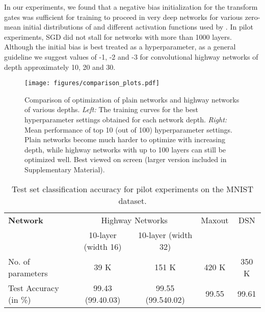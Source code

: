 \documentclass{article}
\begin{document}
In our experiments, we found that a negative bias initialization for the transform gates was sufficient for training to proceed in very deep networks for various zero-mean initial distributions of  and different activation functions used by . In pilot experiments, SGD did not stall for networks with more than 1000 layers. Although the initial bias is best treated as a hyperparameter, as a general guideline we suggest values of -1, -2 and -3 for convolutional highway networks of depth approximately 10, 20 and 30.

\begin{figure*}[t]
\texttt{[image: figures/comparison\_plots.pdf]}
\caption{Comparison of optimization of plain networks and highway networks of various depths. \textit{Left:} The training curves for the best hyperparameter settings obtained for each network depth. \textit{Right:} Mean performance of top 10 (out of 100) hyperparameter settings. Plain networks become much harder to optimize with increasing depth, while highway networks with up to 100 layers can still be optimized well. Best viewed on screen (larger version included in Supplementary Material).}
\label{fig:mnist-convergence}
\end{figure*}


\begin{table*}
	\centering
    \begin{tabular}{lcccc}
    \hline
    \textbf{Network}   & \multicolumn{2}{c}{Highway Networks} & Maxout \cite{Goodfellow2013} & DSN \cite{Lee2015} \\
              & 10-layer (width 16) & 10-layer (width 32) & & \\
    \hline
    No. of parameters & 39 K & 151 K & 420 K & 350 K\\
    Test Accuracy (in \%) & 99.43 (99.40.03) & 99.55 (99.540.02) & 99.55 & 99.61 \\
    \hline
    \end{tabular}
    \caption{Test set classification accuracy for pilot experiments on the MNIST dataset.}
    \label{tab:mnist-results}
\end{table*}
\end{document}
